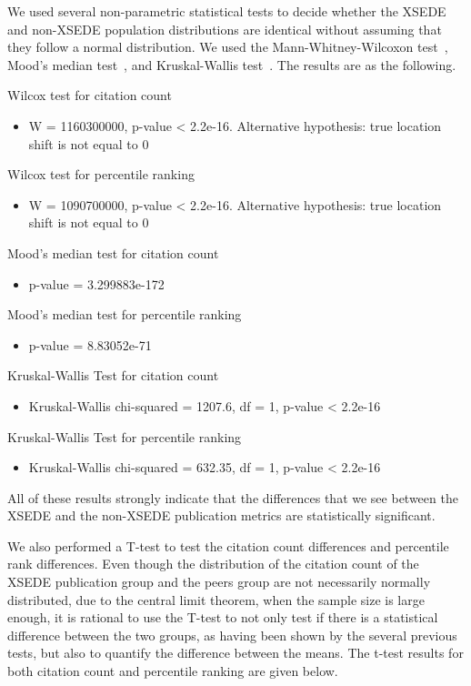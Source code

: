 \documentclass{sig-alternate}
\begin{document}
We used several non-parametric statistical tests to decide whether the
XSEDE and non-XSEDE population distributions are identical without
assuming that they follow a normal distribution.  We used the
Mann-Whitney-Wilcoxon test~\cite{mann1947test}, Mood's median
test~\cite{brown1951median}, and Kruskal-Wallis
test~\cite{kruskal1952use}. The results are as the following.

Wilcox test for citation count
\begin{itemize}
\item W = 1160300000, p-value < 2.2e-16. Alternative hypothesis: true location shift is not equal to 0
\end{itemize}

Wilcox test for percentile ranking
\begin{itemize}
\item W = 1090700000, p-value < 2.2e-16. Alternative hypothesis: true location shift is not equal to 0
\end{itemize}

Mood's median test for citation count
\begin{itemize}
\item p-value = 3.299883e-172
\end{itemize}

Mood's median test for percentile ranking
\begin{itemize}
\item p-value = 8.83052e-71
\end{itemize}

Kruskal-Wallis Test for citation count
\begin{itemize}
\item Kruskal-Wallis chi-squared = 1207.6, df = 1, p-value < 2.2e-16
\end{itemize}

Kruskal-Wallis Test for percentile ranking
\begin{itemize}
\item Kruskal-Wallis chi-squared = 632.35, df = 1, p-value < 2.2e-16
\end{itemize}

All of these results strongly indicate that the differences that we
see between the XSEDE and the non-XSEDE publication metrics are
statistically significant.

We also performed a T-test to test the citation count differences and
percentile rank differences. Even though the distribution of the
citation count of the XSEDE publication group and the peers group are
not necessarily normally distributed, due to the central limit
theorem, when the sample size is large enough, it is rational to use
the T-test to not only test if there is a statistical difference
between the two groups, as having been shown by the several previous
tests, but also to quantify the difference between the means. The
t-test results for both citation count and percentile ranking are
given below.
\end{document}
